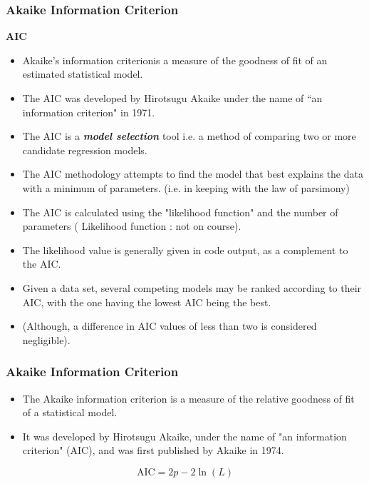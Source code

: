 \documentclass[PredictiveAnalytics101.tex]{subfiles}
\begin{document}
	\begin{frame}
		\frametitle{Akaike Information Criterion}
		
		\textbf{AIC}
		\begin{itemize}
			\item Akaike's information criterionis a measure of the goodness of fit of
			an estimated statistical model. 
			\item The AIC was developed by Hirotsugu Akaike under the name of ``an information criterion" in 1971. 
			\item The AIC is a \textbf{\textit{model selection}} tool i.e. a method of comparing two
			or more candidate regression models. 
			\item The AIC methodology attempts to find the model that best explains the data with a minimum of parameters. (i.e. in keeping with the law of parsimony)
		\end{itemize}
		
	\end{frame}
	\begin{frame}
		\Large
		\begin{itemize}
			\item The AIC is calculated using the "likelihood function" and the number of parameters ( Likelihood function : not on course). 
			\item The likelihood value is generally given in code output, as a complement to the AIC.
			\item Given a data set, several competing models may be ranked according to their AIC, with the one having the lowest AIC being the best. 
			\item (Although, a difference in AIC values of less than two is considered negligible).
		\end{itemize}
		
	\end{frame}
	\begin{frame}
		\frametitle{Akaike Information Criterion}
		\Large
		\begin{itemize}
			\item The Akaike information criterion is a measure of the relative goodness of fit of a statistical model. 
			\item It was developed by Hirotsugu Akaike, under the name of "an information criterion" (AIC), and was first published by Akaike in 1974.
		\end{itemize}
		
		\bigskip
		
		\[\mbox{AIC} = 2p - 2\ln(L)\]
	\end{frame}
\end{document}
